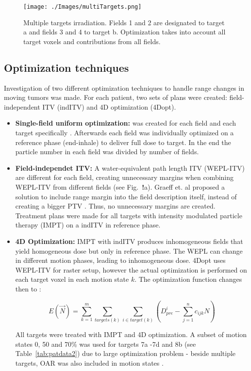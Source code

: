 \documentclass[type=dr, dr=rernat, accentcolor=tud7b,colorbacktitle, bigchapter, openright, twoside, 12pt ]{tudthesis}
\begin{document}
\begin{figure}[H]
	\begin{center}
		\texttt{[image: ./Images/multiTargets.png]}
		\caption{Multiple targets irradiation. Fields 1 and 2 are designated to target a and fields 3 and 4 to target b. Optimization takes into account all target voxels and contributions from all fields.}
		\label{Fig:multiTargets}
	\end{center}
\end{figure}



\subsection{Optimization techniques}

Investigation of two different optimization techniques to handle range changes in moving tumors was made. For each patient, two sets of plans were created: field-independent ITV (indITV) and 4D optimization (4Dopt). 

\begin{itemize}
\item \textbf{Single-field uniform optimization:}  was created for each field and each target specifically \cite{Rietzel2012}. Afterwards each field was individually optimized on a reference phase (end-inhale) to deliver full dose to target. In the end the particle number in each field was divided by number of fields.

\item \textbf{Field-independet ITV:} A water-equivalent path length ITV (WEPL-ITV) are different for each field, creating unnecessary margins when combining WEPL-ITV from different fields (see Fig.~\textbf{!}a). Graeff et. al proposed a solution to include range margin into the field description itself, instead of creating a bigger PTV \cite{Graeff2012}. Thus, no unnecessary margins are created. Treatment plans were made for all targets with intensity modulated particle therapy (IMPT) on a indITV in reference phase.

\item \textbf{4D Optimization:} IMPT with indITV produces inhomogeneous fields that yield homogeneous dose but only in reference phase. The WEPL can change in different motion phases, leading to inhomogeneous dose.
4Dopt uses WEPL-ITV for raster setup, however the actual optimization is performed on each target voxel in each motion state $k$. The optimization function changes then to \cite{Graeff2012}:

\begin{equation}
\label{eq-multiCost}
E(\vec{N}) = \sum_{k=1}^{m}\sum_{targets(k)} \sum_{i\in target(k)} \left( D_{pre}^{i} -\sum_{j=1}^n c_{ijk}N\right)
\end{equation}

All targets were treated with IMPT and 4D optimization. A subset of motion states 0, 50 and 70\% was used for targets 7a -7d and 8b (see Table~\ref{tab:patdata2}) due to large optimization problem - beside multiple targets, OAR was also included
in motion states \cite{Graeff2012}.



\end{itemize}
\end{document}
